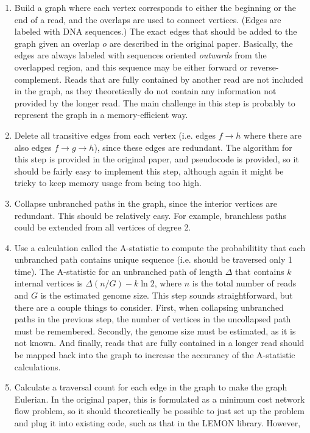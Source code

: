 \documentclass[letterpaper,12pt]{article}
\begin{document}
\begin{enumerate}
\item Build a graph where each vertex corresponds to either the beginning or the
end of a read, and the overlaps are used to connect vertices.  (Edges are
labeled with DNA sequences.)  The exact edges that should be added to the graph
given an overlap $o$ are described in the original paper.  Basically, the edges
are always labeled with sequences oriented {\em outwards} from the overlapped
region, and this sequence may be either forward or reverse-complement.  Reads
that are fully contained by another read are not included in the graph, as they
theoretically do not contain any information not provided by the longer read.
The main challenge in this step is probably to represent the graph in a
memory-efficient way.
\item Delete all transitive edges from each vertex (i.e. edges $f \to h$ where
there are also edges $f \to g \to h$), since these edges are redundant.  The
algorithm for this step is provided in the original paper, and pseudocode is
provided, so it should be fairly easy to implement this step, although again it
might be tricky to keep memory usage from being too high.
\item Collapse unbranched paths in the graph, since the interior vertices are
redundant.  This should be relatively easy.  For example, branchless paths could
be extended from all vertices of degree 2.
\item Use a calculation called the A-statistic to compute the probabilitity that
each unbranched path contains unique sequence (i.e. should be traversed only 1
time).  The A-statistic for an unbranched path of length $\Delta$ that contains
$k$ internal vertices is $\Delta(n/G) - k \ln 2$, where $n$ is the total number
of reads and $G$ is the estimated genome size.  This step sounds
straightforward, but there are a couple things to consider.  First, when
collapsing unbranched paths in the previous step, the number of vertices in the
uncollapsed path must be remembered.  Secondly, the genome size must be
estimated, as it is not known.  And finally, reads that are fully contained in a
longer read should be mapped back into the graph to increase the accurancy of
the A-statistic calculations.
\item Calculate a traversal count for each edge in the graph to make the graph
Eulerian.  In the original paper, this is formulated as a minimum cost network
flow problem, so it should theoretically be possible to just set up the problem
and plug it into existing code, such as that in the LEMON library.  However,

\end{enumerate}
\end{document}
